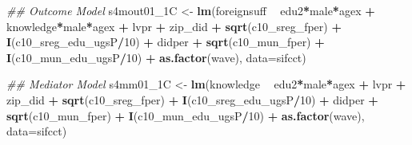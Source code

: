 \documentclass[
]{article}
\newenvironment{Shaded}{\begin{snugshade}}{\end{snugshade}}
\newcommand{\CommentTok}[1]{\textcolor[rgb]{0.56,0.35,0.01}{\textit{#1}}}
\newcommand{\DataTypeTok}[1]{\textcolor[rgb]{0.13,0.29,0.53}{#1}}
\newcommand{\DecValTok}[1]{\textcolor[rgb]{0.00,0.00,0.81}{#1}}
\newcommand{\KeywordTok}[1]{\textcolor[rgb]{0.13,0.29,0.53}{\textbf{#1}}}
\newcommand{\NormalTok}[1]{#1}
\newcommand{\OperatorTok}[1]{\textcolor[rgb]{0.81,0.36,0.00}{\textbf{#1}}}
\newcommand{\StringTok}[1]{\textcolor[rgb]{0.31,0.60,0.02}{#1}}
\begin{document}
\begin{Shaded}
\begin{Highlighting}[]
\CommentTok{## Outcome Model }
\NormalTok{s4mout01_1C <-}\StringTok{ }\KeywordTok{lm}\NormalTok{(foreignsuff  }\OperatorTok{~}\StringTok{ }\NormalTok{edu2}\OperatorTok{*}\NormalTok{male}\OperatorTok{*}\NormalTok{agex }\OperatorTok{+}\StringTok{ }\NormalTok{knowledge}\OperatorTok{*}\NormalTok{male}\OperatorTok{*}\NormalTok{agex }\OperatorTok{+}\StringTok{ }\NormalTok{lvpr }\OperatorTok{+}\StringTok{  }
\StringTok{                    }\NormalTok{zip_did }\OperatorTok{+}\StringTok{ }\KeywordTok{sqrt}\NormalTok{(c10_sreg_fper) }\OperatorTok{+}\StringTok{ }\KeywordTok{I}\NormalTok{(c10_sreg_edu_ugsP}\OperatorTok{/}\DecValTok{10}\NormalTok{) }\OperatorTok{+}\StringTok{ }
\StringTok{                    }\NormalTok{didper }\OperatorTok{+}\StringTok{ }\KeywordTok{sqrt}\NormalTok{(c10_mun_fper) }\OperatorTok{+}\StringTok{ }\KeywordTok{I}\NormalTok{(c10_mun_edu_ugsP}\OperatorTok{/}\DecValTok{10}\NormalTok{) }\OperatorTok{+}\StringTok{ }
\StringTok{                    }\KeywordTok{as.factor}\NormalTok{(wave), }\DataTypeTok{data=}\NormalTok{sifcct)}

\CommentTok{## Mediator Model}
\NormalTok{s4mm01_1C <-}\StringTok{ }\KeywordTok{lm}\NormalTok{(knowledge  }\OperatorTok{~}\StringTok{ }\NormalTok{edu2}\OperatorTok{*}\NormalTok{male}\OperatorTok{*}\NormalTok{agex }\OperatorTok{+}\StringTok{ }\NormalTok{lvpr }\OperatorTok{+}\StringTok{  }
\StringTok{                  }\NormalTok{zip_did }\OperatorTok{+}\StringTok{ }\KeywordTok{sqrt}\NormalTok{(c10_sreg_fper) }\OperatorTok{+}\StringTok{ }\KeywordTok{I}\NormalTok{(c10_sreg_edu_ugsP}\OperatorTok{/}\DecValTok{10}\NormalTok{) }\OperatorTok{+}\StringTok{ }
\StringTok{                  }\NormalTok{didper }\OperatorTok{+}\StringTok{ }\KeywordTok{sqrt}\NormalTok{(c10_mun_fper) }\OperatorTok{+}\StringTok{ }\KeywordTok{I}\NormalTok{(c10_mun_edu_ugsP}\OperatorTok{/}\DecValTok{10}\NormalTok{) }\OperatorTok{+}\StringTok{ }
\StringTok{                  }\KeywordTok{as.factor}\NormalTok{(wave), }\DataTypeTok{data=}\NormalTok{sifcct)}


\end{Highlighting}
\end{Shaded}
\end{document}
